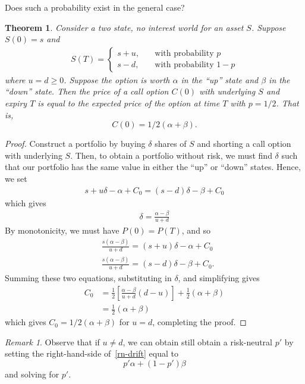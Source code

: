 \documentclass[12pt]{article}
\theoremstyle{plain}
\newtheorem{theorem}{Theorem}
\theoremstyle{definition}
\theoremstyle{remark}
\newtheorem*{remark}{Remark}
\numberwithin{equation}{section}  %
\begin{document}
Does such a probability exist in the general case?
\begin{theorem}
\label{thm:risk-neutral}
Consider a two state, no interest world for an asset $S$. Suppose $S(0) = s$
and 
\begin{equation*}
\begin{split}
S(T) = \begin{cases}
	s + u, \quad & \text{with probability }p \\
	s - d, \quad & \text{with probability }1-p
\end{cases}
\end{split}
\end{equation*}
where $u = d \ge 0$. Suppose the option is worth $\alpha$ in the ``up'' state
and $\beta$ in the ``down'' state.
Then the price of a call option $C(0)$ with underlying
$S$ and expiry $T$ is equal to the expected price of the option at time $T$
with $p = 1/2$. That is, \[ C(0) = 1/2(\alpha + \beta). \]
\end{theorem}
\begin{proof}
Construct a portfolio by buying $\delta$
shares of $S$ and shorting a call option with underlying $S$.
Then, to obtain a portfolio without risk, we must find $\delta$ such that
our portfolio has the same value in either the ``up'' or ``down'' states.
Hence, we set 
\begin{equation*}
\begin{split}
s + u \delta - \alpha + C_{0} = (s - d) \delta - \beta + C_{0}
\end{split}
\end{equation*}
which gives
\begin{equation*}
\begin{split}
	\delta = \frac{\alpha - \beta}{u + d}
\end{split}
\end{equation*}
By monotonicity, we must have $P(0) = P(T)$,
and so
\begin{equation*}
\begin{split}
& \frac{s(\alpha - \beta)}{u + d} = (s + u) \delta - \alpha + C_{0} \\
& \frac{s(\alpha - \beta)}{u + d} = (s - d) \delta - \beta + C_{0}. 
\end{split}
\end{equation*}
Summing these two equations, substituting in $\delta$, and simplifying gives
\begin{equation}
	\label{rn-drift}
\begin{split}
	C_{0} & =
	\frac{1}{2} \left [ \frac{\alpha - \beta}{u + d} (d - u) \right ]
	+ \frac{1}{2}(\alpha + \beta)
	\\
	& = \frac{1}{2}(\alpha + \beta)
\end{split}
\end{equation}
which gives $C_{0} = 1/2(\alpha + \beta)$ for $u = d$, completing the proof.
\end{proof}
\begin{remark}
Observe that if $u \neq d$, we can obtain still obtain a risk-neutral $p'$
by setting the right-hand-side of~\eqref{rn-drift} equal to 
\[p' \alpha + (1-p')\beta \] and solving for $p'$. 
\end{remark}
\end{document}
